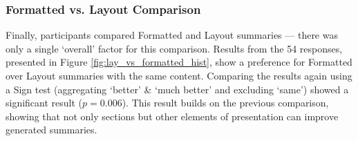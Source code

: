       \tocless\subsubsection{Formatted vs. Layout Comparison}
        \noindent Finally, participants compared Formatted and Layout summaries --- there was only a single `overall' factor for this comparison. Results from the 54 responses, presented in Figure \ref{fig:lay_vs_formatted_hist}, show a preference for Formatted over Layout summaries with the same content. Comparing the results again using a Sign test (aggregating `better' \& `much better' and excluding `same') showed a significant result ($p = 0.006$). This result builds on the previous comparison, showing that not only sections but other elements of presentation can improve generated summaries.

